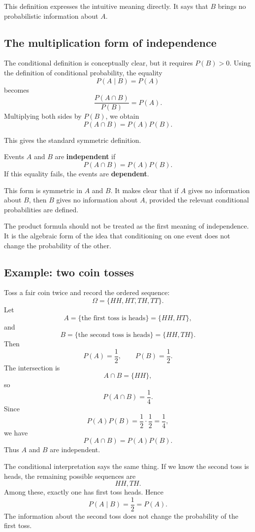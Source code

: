 This definition expresses the intuitive meaning directly. It says that \(B\)
brings no probabilistic information about \(A\).

\subsection*{The multiplication form of independence}

The conditional definition is conceptually clear, but it requires \(P(B)>0\).
Using the definition of conditional probability, the equality
\[
P(A\mid B)=P(A)
\]
becomes
\[
\frac{P(A\cap B)}{P(B)}=P(A).
\]
Multiplying both sides by \(P(B)\), we obtain
\[
P(A\cap B)=P(A)P(B).
\]

This gives the standard symmetric definition.

\begin{definitionbox}
Events \(A\) and \(B\) are \textbf{independent} if
\[
P(A\cap B)=P(A)P(B).
\]
If this equality fails, the events are \textbf{dependent}.
\end{definitionbox}

This form is symmetric in \(A\) and \(B\). It makes clear that if \(A\) gives no
information about \(B\), then \(B\) gives no information about \(A\), provided
the relevant conditional probabilities are defined.

\begin{remarkbox}
The product formula should not be treated as the first meaning of independence.
It is the algebraic form of the idea that conditioning on one event does not
change the probability of the other.
\end{remarkbox}

\subsection*{Example: two coin tosses}

Toss a fair coin twice and record the ordered sequence:
\[
\Omega=\{HH,HT,TH,TT\}.
\]
Let
\[
A=\{\text{the first toss is heads}\}=\{HH,HT\},
\]
and
\[
B=\{\text{the second toss is heads}\}=\{HH,TH\}.
\]
Then
\[
P(A)=\frac12,\qquad P(B)=\frac12.
\]
The intersection is
\[
A\cap B=\{HH\},
\]
so
\[
P(A\cap B)=\frac14.
\]
Since
\[
P(A)P(B)=\frac12\cdot\frac12=\frac14,
\]
we have
\[
P(A\cap B)=P(A)P(B).
\]
Thus \(A\) and \(B\) are independent.

The conditional interpretation says the same thing. If we know the second toss
is heads, the remaining possible sequences are
\[
HH,TH.
\]
Among these, exactly one has first toss heads. Hence
\[
P(A\mid B)=\frac12=P(A).
\]
The information about the second toss does not change the probability of the
first toss.


